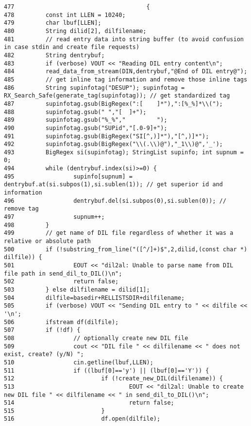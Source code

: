 \footnotesize\begin{verbatim}477                                      {
478         const int LLEN = 10240;
479         char lbuf[LLEN];
480         String dilid[2], dilfilename;
481         // read entry data into string buffer (to avoid confusion in case stdin and create file requests)
482         String dentrybuf;
483         if (verbose) VOUT << "Reading DIL entry content\n";
484         read_data_from_stream(DIN,dentrybuf,"@End of DIL entry@");
485         // get inline tag information and remove those inline tags
486         String supinfotag("DESUP"); supinfotag = RX_Search_Safe(generate_tag(supinfotag)); // get standardized tag
487         supinfotag.gsub(BigRegex(":[    ]*"),":[%_%]*\\(");
488         supinfotag.gsub(" ","[  ]+");
489         supinfotag.gsub("%_%","         ");
490         supinfotag.gsub("SUPid","[.0-9]+");
491         supinfotag.gsub(BigRegex("SI[^,)]*"),"[^,)]*");
492         supinfotag.gsub(BigRegex("\\(.\\)@"),"_1\\)@",'_');
493         BigRegex si(supinfotag); StringList supinfo; int supnum = 0;
494         while (dentrybuf.index(si)>=0) {
495                 supinfo[supnum] = dentrybuf.at(si.subpos(1),si.sublen(1)); // get superior id and information
496                 dentrybuf.del(si.subpos(0),si.sublen(0)); // remove tag
497                 supnum++;
498         }
499         // get name of DIL file regardless of whether it was a relative or absolute path
500         if (!substring_from_line("([^/]+)$",2,dilid,(const char *) dilfile)) {
501                 EOUT << "dil2al: Unable to parse name from DIL file path in send_dil_to_DIL()\n";
502                 return false;
503         } else dilfilename = dilid[1];
504         dilfile=basedir+RELLISTSDIR+dilfilename;
505         if (verbose) VOUT << "Sending DIL entry to " << dilfile << '\n';
506         ifstream df(dilfile);
507         if (!df) {
508                 // optionally create new DIL file
509                 cout << "DIL file " << dilfilename << " does not exist, create? (y/N) ";
510                 cin.getline(lbuf,LLEN);
511                 if ((lbuf[0]=='y') || (lbuf[0]=='Y')) {
512                         if (!create_new_DIL(dilfilename)) {
513                                 EOUT << "dil2al: Unable to create new DIL file " << dilfilename << " in send_dil_to_DIL()\n";
514                                 return false;
515                         }
516                         df.open(dilfile);

\end{verbatim}
